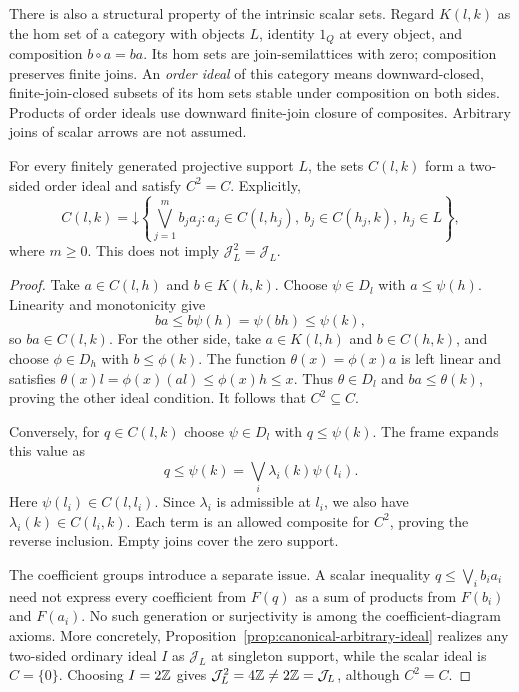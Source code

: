 There is also a structural property of the intrinsic scalar sets.
Regard $K(l,k)$ as the hom set of a category with objects $L$, identity
$1_Q$ at every object, and composition $b\circ a=ba$. Its hom sets are
join-semilattices with zero; composition preserves finite joins. An
\emph{order ideal} of this category means downward-closed,
finite-join-closed subsets of its hom sets stable under composition on
both sides. Products of order ideals use downward finite-join closure
of composites. Arbitrary joins of scalar arrows are not assumed.

\begin{proposition}
\label{prop:scalar-ideal-idempotent}
For every finitely generated projective support $L$, the sets $C(l,k)$
form a two-sided order ideal and satisfy $C^2=C$. Explicitly,
\[
 C(l,k)=\mathord\downarrow\left\{
  \bigvee_{j=1}^m b_j a_j:
  a_j\in C(l,h_j),\ b_j\in C(h_j,k),\ h_j\in L\right\},
\]
where $m\geq0$. This does not imply
$\mathcal J_L^2=\mathcal J_L$.
\end{proposition}
\begin{proof}
Take $a\in C(l,h)$ and $b\in K(h,k)$. Choose $\psi\in D_l$ with
$a\leq\psi(h)$. Linearity and monotonicity give
\[
 ba\leq b\psi(h)=\psi(bh)\leq\psi(k),
\]
so $ba\in C(l,k)$. For the other side, take $a\in K(l,h)$ and
$b\in C(h,k)$, and choose $\phi\in D_h$ with $b\leq\phi(k)$.
The function $\theta(x)=\phi(x)a$ is left linear and satisfies
$\theta(x)l=\phi(x)(al)\leq\phi(x)h\leq x$.
Thus $\theta\in D_l$ and $ba\leq\theta(k)$, proving the other ideal
condition. It follows that $C^2\subseteq C$.

Conversely, for $q\in C(l,k)$ choose $\psi\in D_l$ with
$q\leq\psi(k)$. The frame expands this value as
\[
 q\leq\psi(k)=\bigvee_i\lambda_i(k)\psi(l_i).
\]
Here $\psi(l_i)\in C(l,l_i)$. Since $\lambda_i$ is admissible at
$l_i$, we also have $\lambda_i(k)\in C(l_i,k)$. Each term is an
allowed composite for $C^2$, proving the reverse inclusion. Empty joins
cover the zero support.

The coefficient groups introduce a separate issue. A scalar inequality
$q\leq\bigvee_i b_i a_i$ need not express every coefficient from $F(q)$
as a sum of products from $F(b_i)$ and $F(a_i)$. No such generation or
surjectivity is among the coefficient-diagram axioms. More concretely,
Proposition~\ref{prop:canonical-arbitrary-ideal} realizes any two-sided
ordinary ideal $I$ as $\mathcal J_L$ at singleton support, while the
scalar ideal is $C=\{0\}$. Choosing $I=2\mathbb Z$ gives
$\mathcal J_L^2=4\mathbb Z\ne2\mathbb Z=\mathcal J_L$, although $C^2=C$.
\end{proof}
